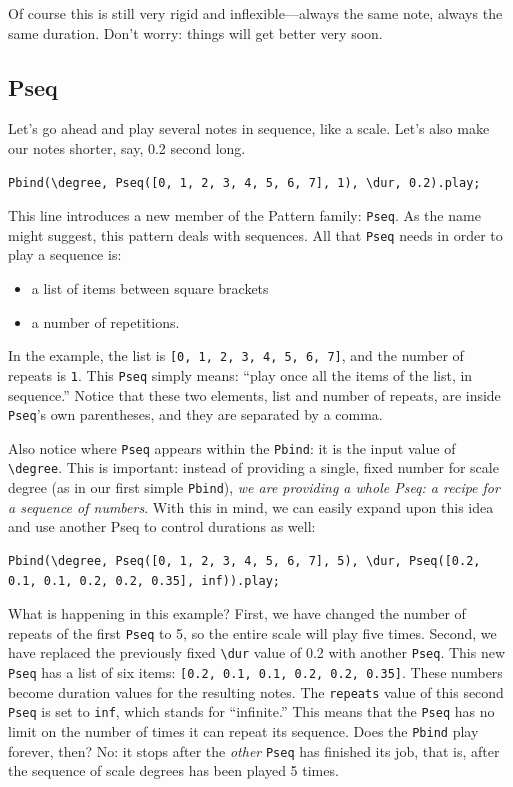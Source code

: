 Of course this is still very rigid and inflexible---always the same note, always the same duration. Don't worry: things will get better very soon.

\subsection{Pseq}

Let's go ahead and play several notes in sequence, like a scale. Let's also make our notes shorter, say, 0.2 second long.
 
\begin{lstlisting}[style=SuperCollider-IDE, basicstyle=\scttfamily\footnotesize]
Pbind(\degree, Pseq([0, 1, 2, 3, 4, 5, 6, 7], 1), \dur, 0.2).play;
\end{lstlisting}

This line introduces a new member of the Pattern family: \texttt{Pseq}. As the name might suggest, this pattern deals with sequences. All that \texttt{Pseq} needs in order to play a sequence is:
\begin{itemize}
\item a list of items between square brackets
\item a number of repetitions.
\end{itemize} 

In the example, the list is \texttt{[0, 1, 2, 3, 4, 5, 6, 7]}, and the number of repeats is \texttt{1}. This \texttt{Pseq} simply means: ``play once all the items of the list, in sequence.'' Notice that these two elements, list and number of repeats, are inside \texttt{Pseq}'s own parentheses, and they are separated by a comma.

Also notice where \texttt{Pseq} appears within the \texttt{Pbind}: it is the input value of \texttt{\textbackslash degree}. This is important: instead of providing a single, fixed number for scale degree (as in our first simple \texttt{Pbind}), \emph{we are providing a whole Pseq: a recipe for a sequence of numbers}. With this in mind, we can easily expand upon this idea and use another Pseq to control durations as well:

 
\begin{lstlisting}[style=SuperCollider-IDE, basicstyle=\scttfamily\footnotesize]
Pbind(\degree, Pseq([0, 1, 2, 3, 4, 5, 6, 7], 5), \dur, Pseq([0.2, 0.1, 0.1, 0.2, 0.2, 0.35], inf)).play;
\end{lstlisting}
 
What is happening in this example? First, we have changed the number of repeats of the first \texttt{Pseq} to 5, so the entire scale will play five times. Second, we have replaced the previously fixed \texttt{\textbackslash dur} value of 0.2 with another \texttt{Pseq}. This new \texttt{Pseq} has a list of six items: \texttt{[0.2, 0.1, 0.1, 0.2, 0.2, 0.35]}. These numbers become duration values for the resulting notes. The \texttt{repeats} value of this second \texttt{Pseq} is set to \texttt{inf}, which stands for ``infinite.'' This means that the \texttt{Pseq} has no limit on the number of times it can repeat its sequence. Does the \texttt{Pbind} play forever, then? No: it stops after the \emph{other} \texttt{Pseq} has finished its job, that is, after the sequence of scale degrees has been played 5 times.

